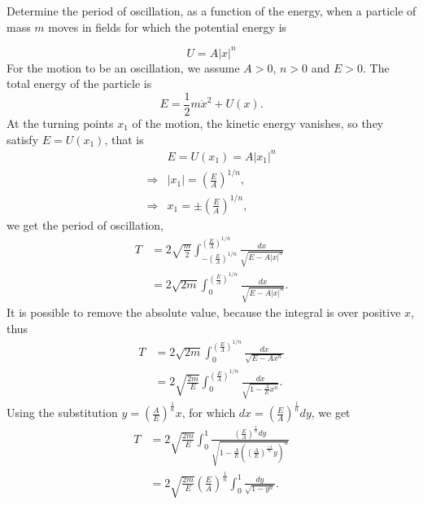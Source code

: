 \begin{problem}[title={Period versus energy in three potential wells}]
{
Determine the period of oscillation, as a function of the energy, when a particle of mass $m$ moves in fields for which the potential energy is
}{}{}
\end{problem}
\begin{subproblem}
{
\begin{equation*}
    U = A|x|^n
\end{equation*}
}
{
For the motion to be an oscillation, we assume $A>0$, $n>0$ and $E>0$. The total energy of the particle is
\begin{equation*}
    E = \frac{1}{2}m\Dot{x}^2 + U(x).
\end{equation*}
At the turning points $x_1$ of the motion, the kinetic energy vanishes, so they satisfy $E = U(x_1)$, that is
\begin{align*}
    &E = U(x_1) = A|x_1|^n \\
    \Rightarrow &|x_1| = \left( \frac{E}{A} \right)^{1/n}, \\
     \Rightarrow &x_1 = \pm \left( \frac{E}{A} \right)^{1/n},
\end{align*}
we get the period of oscillation,
\begin{align*}
    T &= 2\sqrt{\frac{m}{2}} \int_{-\left( \frac{E}{A} \right)^{1/n}}^{\left( \frac{E}{A}\right)^{1/n} }\frac{dx}{\sqrt{E-A|x|^n}} \\
    &= 2\sqrt{2m} \int_0^{\left( \frac{E}{A}\right)^{1/n} }\frac{dx}{\sqrt{E-A|x|^n}} .
\end{align*}
It is possible to remove the absolute value, because the integral is over positive $x$, thus
\begin{align*}
    T &= 2\sqrt{2m} \int_0^{\left( \frac{E}{A}\right)^{1/n} }\frac{dx}{\sqrt{E-Ax^n}} \\
    &= 2\sqrt{\frac{2m}{E}} \int_0^{\left( \frac{E}{A}\right)^{1/n} }\frac{dx}{\sqrt{1-\frac{A}{E}x^n}}.
\end{align*}
Using the substitution $y = \left(\frac{A}{E}\right)^{\frac{1}{n}}x$, for which $dx = \left(\frac{E}{A}\right)^{\frac{1}{n}}dy$, we get
\begin{align*}
    T &= 2\sqrt{\frac{2m}{E}} \int_0^1 \frac{\left(\frac{E}{A}\right)^{\frac{1}{n}}dy}{\sqrt{1-\frac{A}{E}\left(\left(\frac{A}{E}\right)^{\frac{-1}{n}}y\right)^n}} \\
    &= 2\sqrt{\frac{2m}{E}} \left(\frac{E}{A}\right)^{\frac{1}{n}} \int_0^1 \frac{dy}{\sqrt{1-y^n}} .
\end{align*}
}
\end{subproblem}

